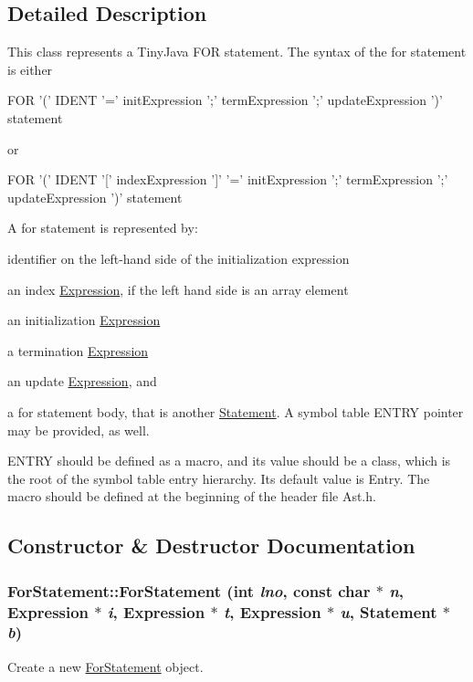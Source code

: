 \subsection{Detailed Description}
This class represents a TinyJava FOR statement. The syntax of the for statement is either
\begin{DoxyItemize}
\item FOR '(' IDENT '=' initExpression ';' termExpression ';' updateExpression ')' statement
\end{DoxyItemize}

or


\begin{DoxyItemize}
\item FOR '(' IDENT '\mbox{[}' indexExpression '\mbox{]}' '=' initExpression ';' termExpression ';' updateExpression ')' statement
\end{DoxyItemize}

A for statement is represented by:
\begin{DoxyItemize}
\item identifier on the left-\/hand side of the initialization expression
\item an index \hyperlink{classExpression}{Expression}, if the left hand side is an array element
\item an initialization \hyperlink{classExpression}{Expression}
\item a termination \hyperlink{classExpression}{Expression}
\item an update \hyperlink{classExpression}{Expression}, and
\item a for statement body, that is another \hyperlink{classStatement}{Statement}. A symbol table ENTRY pointer may be provided, as well.
\end{DoxyItemize}

ENTRY should be defined as a macro, and its value should be a class, which is the root of the symbol table entry hierarchy. Its default value is Entry. The macro should be defined at the beginning of the header file Ast.h. 

\subsection{Constructor \& Destructor Documentation}
\hypertarget{classForStatement_a34f22456bd665a1d358716e7e71a2eb1}{
\subsubsection[{ForStatement}]{\setlength{\rightskip}{0pt plus 5cm}ForStatement::ForStatement (int {\em lno}, \/  const char $\ast$ {\em n}, \/  {\bf Expression} $\ast$ {\em i}, \/  {\bf Expression} $\ast$ {\em t}, \/  {\bf Expression} $\ast$ {\em u}, \/  {\bf Statement} $\ast$ {\em b})}}
\label{classForStatement_a34f22456bd665a1d358716e7e71a2eb1}
Create a new \hyperlink{classForStatement}{ForStatement} object.


